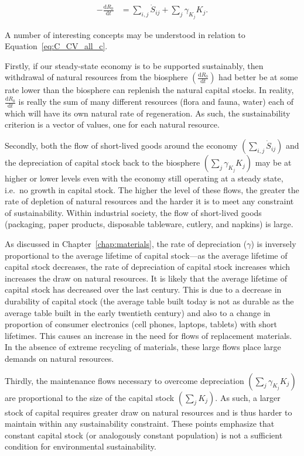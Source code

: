 \begin{align}\label{eq:C_CV_all_c}
	- \frac{\mathrm{d}R_{0}}{\mathrm{d}t}										&
	= \sum_{i,j}\dot{S}_{ij}
	+ \sum_{j}\gamma_{K_{j}}K_{j}.
\end{align}

A number of interesting concepts may be understood in
relation to Equation~\ref{eq:C_CV_all_c}. 

Firstly,
if our steady-state economy is to be supported
sustainably,
then withdrawal of natural resources from the biosphere
$\left(\frac{\mathrm{d}R_{0}}{\mathrm{d}t}\right)$
had better be at some rate lower than the biosphere
can replenish the natural capital stocks. 
In reality, 
$\frac{\mathrm{d}R_{0}}{\mathrm{d}t}$
is really the sum of many different resources
(flora and fauna, water) each of which will have
its own natural rate of regeneration.
As such, 
the sustainability criterion  is a vector of values,
one for each natural resource.

Secondly,
both the flow of short-lived goods around the economy
$\left(\sum_{i,j}\dot{S}_{ij}\right)$
and the depreciation of capital stock back to the biosphere 
$\left(\sum_{j}\gamma_{K_{j}}K_{j}\right)$
may be at higher or lower levels even with the
economy still operating at a steady state,
i.e.\ no growth in capital stock.
The higher the level of these flows,
the greater the rate of depletion of
natural resources and the harder it is to
meet any constraint of sustainability.
Within industrial society,
the flow of short-lived goods 
(packaging,
paper products,
disposable tableware,
cutlery,
and napkins)
is large.

As discussed in Chapter~\ref{chap:materials},
the rate of depreciation ($\gamma$) is inversely
proportional to the average lifetime of capital stock---as
the average lifetime of capital stock decreases,
the rate of depreciation of capital stock increases which
increases the draw on natural resources.
It is likely that the average lifetime of capital stock has
decreased over the last century.
This is due to a decrease in durability of capital stock
(the average table built today is not as durable as the average table
built in the early twentieth century)
and also to a change in proportion of consumer electronics
(cell phones, laptops, tablets)
with short lifetimes.
This causes an increase in the need for flows of
replacement materials.
In the absence of extreme recycling of materials,
these large flows place large demands on
natural resources.

Thirdly,
the maintenance flows necessary to overcome
depreciation
$\left(\sum_{j}\gamma_{K_{j}}K_{j}\right)$
are proportional to the size of the capital
stock $\left(\sum_{j}K_{j}\right)$.
As such,
a larger stock of capital requires
greater draw on natural resources and is thus harder
to maintain within any sustainability constraint.
These points emphasize that constant capital stock
(or analogously constant population)
is not a sufficient condition for environmental sustainability.


